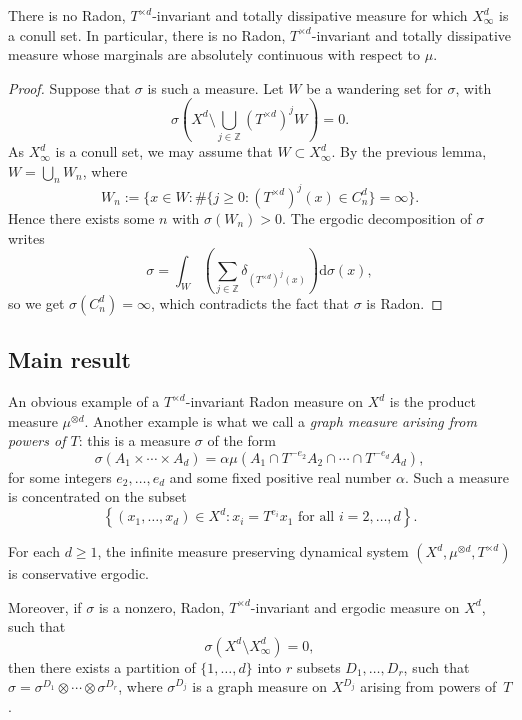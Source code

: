 \documentclass[AHL,Unicode,longabstracts]{cedram}
\newcommand{\egdef}{:=}
\newcommand{\ZZ}{\mathbb{Z}}
\newcommand{\td}{T^{\times d}}
\newcommand*{\dd}{\mathrm{d}}
\newcommand*{\dsigma}{\dd\sigma}
\begin{document}
\begin{prop}\label{prop:dissipative}
There is no Radon, $\td$-invariant and totally dissipative measure for which $X_\infty^d$ is a conull set. In particular, there is no Radon, $\td$-invariant and totally dissipative measure whose marginals are absolutely continuous with respect to $\mu$.
\end{prop}

\begin{proof}
Suppose that $\sigma$ is such a measure. Let $W$ be a wandering set for $\sigma$, with
\[
\sigma\left(X^d\setminus\bigcup_{j\in\ZZ}(\td)^jW\right)=0.
\]
As $X_\infty^d$ is a conull set, we may assume that $W\subset X_\infty^d$. By the previous lemma, $W=\bigcup_{n}W_n$, where
\[
W_n\egdef \bigl\{ x\in W: \#\{j\ge0: (\td)^j(x)\in C_{n}^d\} = \infty
\bigr\}.
\]
Hence there exists some $n$ with $\sigma(W_n)>0$. The ergodic decomposition of $\sigma$ writes
\[
\sigma = \int_W \left(\sum_{j\in\ZZ}\delta_{(\td)^j(x)}\right) \dsigma(x),
\]
so we get $\sigma(C_n^d)=\infty$, which contradicts the fact that $\sigma$ is Radon.
\end{proof}

\subsection{Main result}\label{sec:main}

An obvious example of a $\td$-invariant Radon measure on $X^d$ is the product measure $\mu^{\otimes d}$. Another example is what we call a \emph{graph measure arising from powers of $T$}: this is a measure $\sigma$ of the form
\begin{equation}\label{eq:graph_measure}
\sigma(A_1\times\cdots\times A_d) = \alpha\mu(A_1\cap T^{-e_2}A_2\cap\cdots\cap T^{-e_d}A_d),
\end{equation}
for some integers $e_2,\ldots,e_d$ and some fixed positive real number $\alpha$. Such a measure is concentrated on the subset
\[
\left\{(x_1,\ldots,x_d)\in X^d: x_i=T^{e_i}x_1 \text{ for all }i=2,\ldots,d\right\}.
\]

\begin{theo}\label{thm:msj}
For each $d\ge1$, the infinite measure preserving dynamical system $(X^d,
\mu^{\otimes d},\td)$ is conservative ergodic.

Moreover, if $\sigma$ is a nonzero, Radon, $\td$-invariant and ergodic measure on $X^d$, such that
\begin{equation}\label{eq:weaker}
\sigma \left(X^d \setminus X_\infty^d\right)=0,
\end{equation}
then there exists a partition of $\{1,\ldots,d\}$ into $r$ subsets $D_1,\ldots,D_r$, such that $\sigma=\sigma^{D_1}\otimes \cdots\otimes \sigma^{D_r}$, where $\sigma^{D_j}$ is a graph measure on $X^{D_j}$ arising from powers of~$T$.
\end{theo}
\end{document}
